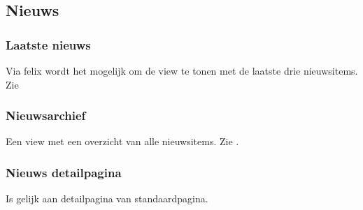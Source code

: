 \subsection{Nieuws}\label{nieuws}

\subsubsection{Laatste nieuws}

Via felix wordt het mogelijk om de view te tonen met de laatste drie nieuwsitems. Zie 

\subsubsection{Nieuwsarchief}

Een view met een overzicht van alle nieuwsitems. Zie .

\subsubsection{Nieuws detailpagina}

Is gelijk aan detailpagina van standaardpagina.